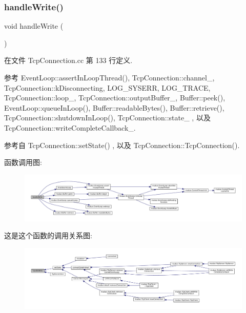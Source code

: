 \subsubsection{\texorpdfstring{handle\+Write()}{handleWrite()}}
{\footnotesize\ttfamily void handle\+Write (\begin{DoxyParamCaption}{ }\end{DoxyParamCaption})\hspace{0.3cm}{\ttfamily [private]}}



在文件 Tcp\+Connection.\+cc 第 133 行定义.



参考 Event\+Loop\+::assert\+In\+Loop\+Thread(), Tcp\+Connection\+::channel\+\_\+, Tcp\+Connection\+::k\+Disconnecting, L\+O\+G\+\_\+\+S\+Y\+S\+E\+RR, L\+O\+G\+\_\+\+T\+R\+A\+CE, Tcp\+Connection\+::loop\+\_\+, Tcp\+Connection\+::output\+Buffer\+\_\+, Buffer\+::peek(), Event\+Loop\+::queue\+In\+Loop(), Buffer\+::readable\+Bytes(), Buffer\+::retrieve(), Tcp\+Connection\+::shutdown\+In\+Loop(), Tcp\+Connection\+::state\+\_\+ , 以及 Tcp\+Connection\+::write\+Complete\+Callback\+\_\+.



参考自 Tcp\+Connection\+::set\+State() , 以及 Tcp\+Connection\+::\+Tcp\+Connection().

函数调用图\+:
\nopagebreak
\begin{figure}[H]
\begin{center}
\leavevmode
\includegraphics[width=350pt]{classmuduo_1_1TcpConnection_ae1d79ff6580eaced59a900144818150d_cgraph}
\end{center}
\end{figure}
这是这个函数的调用关系图\+:
\nopagebreak
\begin{figure}[H]
\begin{center}
\leavevmode
\includegraphics[width=350pt]{classmuduo_1_1TcpConnection_ae1d79ff6580eaced59a900144818150d_icgraph}
\end{center}
\end{figure}
\mbox{\label{classmuduo_1_1TcpConnection_a607d0ab4bcee1d11f7de70501abdcc4b}} 
